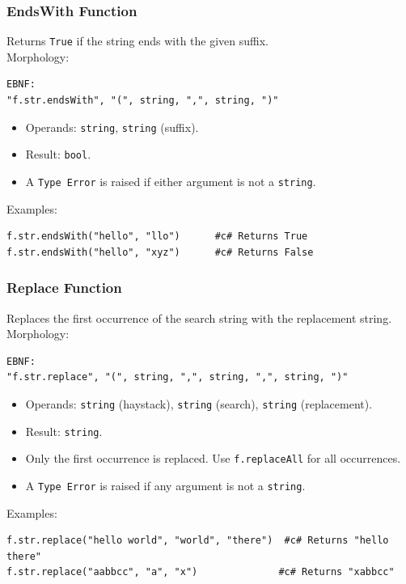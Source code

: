 \subsubsection{EndsWith Function}
Returns \texttt{True} if the string ends with the given suffix. \\
Morphology:
\begin{verbatim}
EBNF:
"f.str.endsWith", "(", string, ",", string, ")"
\end{verbatim}
\begin{itemize}
\item Operands: \texttt{string}, \texttt{string} (suffix).
\item Result: \texttt{bool}.
\item A \texttt{Type Error} is raised if either argument is not a \texttt{string}.
\end{itemize}
Examples:
\begin{verbatim}
f.str.endsWith("hello", "llo")      #c# Returns True
f.str.endsWith("hello", "xyz")      #c# Returns False
\end{verbatim}

\subsubsection{Replace Function}
Replaces the first occurrence of the search string with the replacement string. \\
Morphology:
\begin{verbatim}
EBNF:
"f.str.replace", "(", string, ",", string, ",", string, ")"
\end{verbatim}
\begin{itemize}
\item Operands: \texttt{string} (haystack), \texttt{string} (search), \texttt{string} (replacement).
\item Result: \texttt{string}.
\item Only the first occurrence is replaced. Use \texttt{f.replaceAll} for all occurrences.
\item A \texttt{Type Error} is raised if any argument is not a \texttt{string}.
\end{itemize}
Examples:
\begin{verbatim}
f.str.replace("hello world", "world", "there")  #c# Returns "hello there"
f.str.replace("aabbcc", "a", "x")              #c# Returns "xabbcc"
\end{verbatim}

